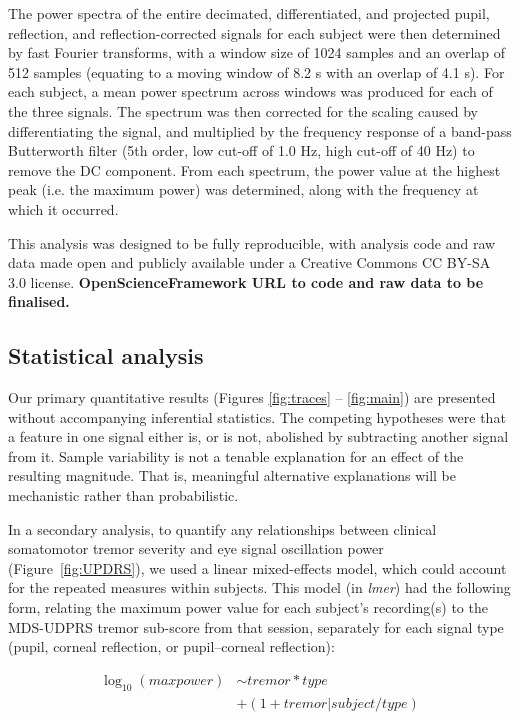 \documentclass[jou,a4paper]{apa6}
\begin{document}
The power spectra of the entire decimated, differentiated, and projected pupil, reflection, and reflection-corrected signals for each subject were then determined by fast Fourier transforms, with a window size of 1024 samples and an overlap of 512 samples (equating to a moving window of 8.2 s with an overlap of 4.1 s). For each subject, a mean power spectrum across windows was produced for each of the three signals. The spectrum was then corrected for the scaling caused by differentiating the signal, and multiplied by the frequency response of a band-pass Butterworth filter (5th order, low cut-off of 1.0 Hz, high cut-off of 40 Hz) to remove the DC component. From each spectrum, the power value at the highest peak (i.e. the maximum power) was determined, along with the frequency at which it occurred.

This analysis was designed to be fully reproducible, with analysis code and raw data made open and publicly available under a Creative Commons CC BY-SA 3.0 license. \textbf{OpenScienceFramework URL to code and raw data to be finalised.}

\subsection{Statistical analysis}
Our primary quantitative results (Figures \ref{fig:traces} -- \ref{fig:main}) are presented without accompanying inferential statistics. The competing hypotheses were that a feature in one signal either is, or is not, abolished by subtracting another signal from it. Sample variability is not a tenable explanation for an effect of the resulting magnitude. That is, meaningful alternative explanations will be mechanistic rather than probabilistic.

In a secondary analysis, to quantify any relationships between clinical somatomotor tremor severity and eye signal oscillation power (Figure~\ref{fig:UPDRS}), we used a linear mixed-effects model, which could account for the repeated measures within subjects. This model (in \textit{lmer}) had the following form, relating the maximum power value for each subject's recording(s) to the MDS-UDPRS tremor sub-score from that session, separately for each signal type (pupil, corneal reflection, or pupil--corneal reflection): 


\begin{equation}\label{eq:model}
\begin{split}
\log_{10} (max power) & \sim tremor \ast type \\
 & + (1 + tremor | subject / type)
\end{split}
\end{equation}
\end{document}
